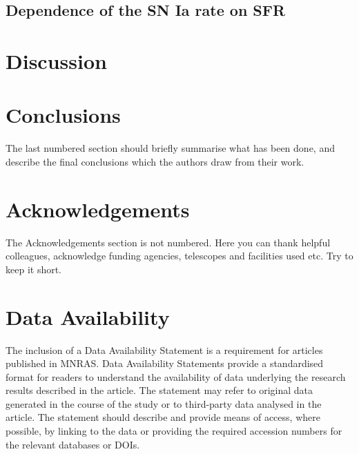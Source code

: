 \documentclass[fleqn,usenatbib]{mnras}
\begin{document}
\subsection{Dependence of the SN Ia rate on SFR \label{subsec:rates_sfr}}

\section{Discussion}
\label{sec:discussion}

\section{Conclusions}
\label{sec:conclusion}
The last numbered section should briefly summarise what has been done, and describe
the final conclusions which the authors draw from their work.

\section*{Acknowledgements}

The Acknowledgements section is not numbered. Here you can thank helpful
colleagues, acknowledge funding agencies, telescopes and facilities used etc.
Try to keep it short.

\section*{Data Availability}

 
The inclusion of a Data Availability Statement is a requirement for articles published in MNRAS. Data Availability Statements provide a standardised format for readers to understand the availability of data underlying the research results described in the article. The statement may refer to original data generated in the course of the study or to third-party data analysed in the article. The statement should describe and provide means of access, where possible, by linking to the data or providing the required accession numbers for the relevant databases or DOIs.







\end{document}
